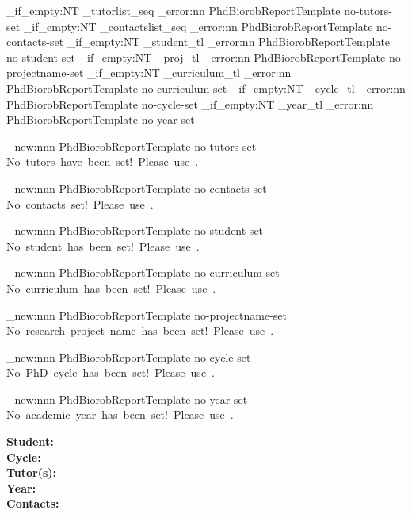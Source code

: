 \NewDocumentCommand{\checksetup}{}
{
	\seq_if_empty:NT \g_tutorlist_seq
	{
		\msg_error:nn {PhdBiorobReportTemplate} {no-tutors-set}
	}
	\seq_if_empty:NT \g_contactslist_seq
	{
		\msg_error:nn {PhdBiorobReportTemplate} {no-contacts-set}
	}
	\tl_if_empty:NT \g_student_tl
	{
		\msg_error:nn {PhdBiorobReportTemplate} {no-student-set}
	}
	\tl_if_empty:NT \g_proj_tl
	{
		\msg_error:nn {PhdBiorobReportTemplate} {no-projectname-set}
	}
	\tl_if_empty:NT \g_curriculum_tl
	{
		\msg_error:nn {PhdBiorobReportTemplate} {no-curriculum-set}
	}
	\tl_if_empty:NT \g_cycle_tl
	{
		\msg_error:nn {PhdBiorobReportTemplate} {no-cycle-set}
	}
	\tl_if_empty:NT \g_year_tl
	{
		\msg_error:nn {PhdBiorobReportTemplate} {no-year-set}
	}
}

\msg_new:nnn {PhdBiorobReportTemplate} {no-tutors-set} {No~tutors~have~been~set!~Please~use~\space\string\setTutors.}

\msg_new:nnn {PhdBiorobReportTemplate} {no-contacts-set} {No~contacts~set!~Please~use~\space\string\setContacts\space.}

\msg_new:nnn {PhdBiorobReportTemplate} {no-student-set} { No~student~has~been~set!~Please~use~\string\setStudent.}

\msg_new:nnn {PhdBiorobReportTemplate} {no-curriculum-set} { No~curriculum~has~been~set!~Please~use~\string\setCurriculumName.}

\msg_new:nnn {PhdBiorobReportTemplate} {no-projectname-set} { No~research~project~name~has~been~set!~Please~use~\string\setResearchProjName.}

\msg_new:nnn {PhdBiorobReportTemplate} {no-cycle-set} { No~PhD~cycle~has~been~set!~Please~use~\space\string\setCycle.}

\msg_new:nnn {PhdBiorobReportTemplate} {no-year-set} { No~academic~year~has~been~set!~Please~use~\space\string\setYear.}

\NewDocumentCommand{\signature}{}
{
	\vfill
	\noindent
	\begin{minipage}{\textwidth}
		\begin{flushright}
			\seq_map_inline:Nn \g_tutorlist_seq
			{
				##1 \\ \rule{60mm}{.55pt} \\[1ex]
			}
		\end{flushright}
	\end{minipage}
}

\NewDocumentCommand{\addPersonalData}{}
{
	\begin{flushleft}
		\vspace{1.5cm}
		\large{\textbf{Student:~}}\large{{\getStudentName}}\vspace{0.2cm}\\
		\large{\textbf{Cycle:~}}\large{\getCycle}\vspace{0.2cm}\\
		\large{\textbf{Tutor(s):~}}\large{{\getTutorsList}}\vspace{0.2cm}\\
		\large{\textbf{Year:~}}\large{\getYear}\vspace{0.2cm}\\
		\large{\textbf{Contacts:~}}\large{\getContactsList}
	\end{flushleft}
}

